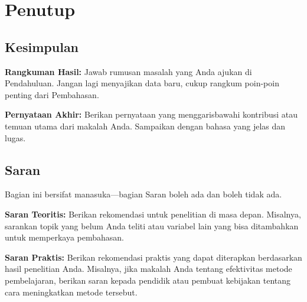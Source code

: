 \section{Penutup}


\subsection{Kesimpulan}

\textbf{Rangkuman Hasil:} Jawab rumusan masalah yang Anda ajukan di Pendahuluan. Jangan lagi menyajikan data baru, cukup rangkum poin-poin penting dari Pembahasan.

\textbf{Pernyataan Akhir:} Berikan pernyataan yang menggarisbawahi kontribusi atau temuan utama dari makalah Anda. Sampaikan dengan bahasa yang jelas dan lugas.

\subsection{Saran}

Bagian ini bersifat manasuka---bagian Saran boleh ada dan boleh tidak ada.

\textbf{Saran Teoritis:} Berikan rekomendasi untuk penelitian di masa depan. Misalnya, sarankan topik yang belum Anda teliti atau variabel lain yang bisa ditambahkan untuk memperkaya pembahasan.

\textbf{Saran Praktis:} Berikan rekomendasi praktis yang dapat diterapkan berdasarkan hasil penelitian Anda. Misalnya, jika makalah Anda tentang efektivitas metode pembelajaran, berikan saran kepada pendidik atau pembuat kebijakan tentang cara meningkatkan metode tersebut.